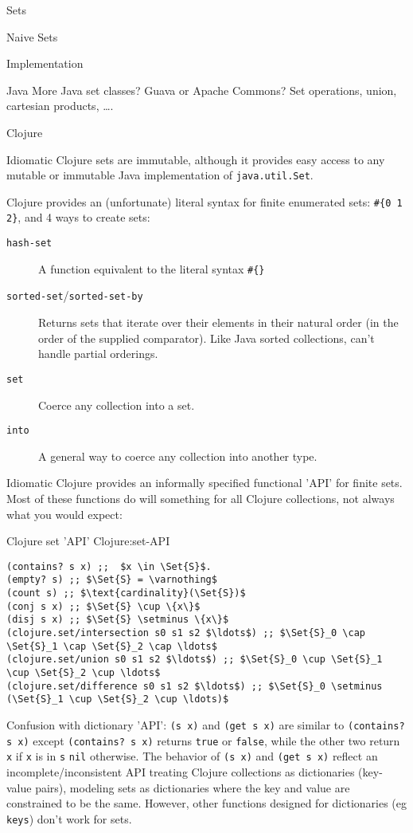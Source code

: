 \begin{plSection}{Sets}
\begin{plSection}{Naive Sets}
\begin{plSection}{Implementation}
\begin{plSection}{Java}
More Java set classes? Guava or Apache Commons?
Set operations, union, cartesian products, \ldots.
\end{plSection}%
\begin{plSection}{Clojure}
\lstset{language=Clojure}

Idiomatic Clojure sets are immutable, although it provides easy
access to any mutable or immutable Java implementation of
\lstinline|java.util.Set|.

Clojure provides an (unfortunate) literal syntax for finite
enumerated sets: 
\lstinline|#{0 1 2}|, and 4 ways to create sets:
\begin{description}
\item[\texttt{hash-set}] A function equivalent to the
literal syntax \lstinline|#{}|
\item[\texttt{sorted-set}/\texttt{sorted-set-by}] Returns
sets that iterate over their elements in their natural order (in the
order of the supplied comparator). Like Java sorted collections,
can't handle partial orderings.
\item[\texttt{set}] Coerce any collection into a set.
\item[\texttt{into}] A general way to coerce any collection
into another type.
\end{description}

Idiomatic Clojure provides an informally specified functional
'API' for finite sets. Most of these functions do will something
for all Clojure collections, not always what you would expect:
\begin{plListing}
{Clojure set 'API'}
{Clojure:set-API}
\begin{lstlisting}
(contains? s x) ;;  $x \in \Set{S}$.
(empty? s) ;; $\Set{S} = \varnothing$
(count s) ;; $\text{cardinality}(\Set{S})$
(conj s x) ;; $\Set{S} \cup \{x\}$
(disj s x) ;; $\Set{S} \setminus \{x\}$
(clojure.set/intersection s0 s1 s2 $\ldots$) ;; $\Set{S}_0 \cap \Set{S}_1 \cap \Set{S}_2 \cap \ldots$ 
(clojure.set/union s0 s1 s2 $\ldots$) ;; $\Set{S}_0 \cup \Set{S}_1 \cup \Set{S}_2 \cup \ldots$ 
(clojure.set/difference s0 s1 s2 $\ldots$) ;; $\Set{S}_0 \setminus (\Set{S}_1 \cup \Set{S}_2 \cup \ldots)$
\end{lstlisting}
\end{plListing}

Confusion with dictionary 'API':
 \lstinline|(s x)| and \lstinline|(get s x)| are similar to
 \lstinline|(contains? s x)| except \lstinline|(contains? s x)| returns
 \lstinline|true| or \lstinline|false|, while the other two return
 \lstinline|x| if \lstinline|x| is in \lstinline|s| \lstinline|nil| otherwise.
The behavior of \lstinline|(s x)| and \lstinline|(get s x)| reflect an
incomplete/inconsistent API treating Clojure collections as
dictionaries (key-value pairs), modeling sets as dictionaries
where the key and value are constrained to be the same.
However, other functions designed for dictionaries (eg
\lstinline|keys|) don't work for sets.
 

\end{plSection}
\end{plSection}
\end{plSection}
\end{plSection}
